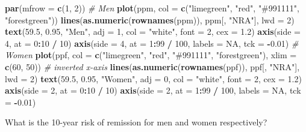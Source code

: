 \documentclass[
]{book}
\newenvironment{Shaded}{\begin{snugshade}}{\end{snugshade}}
\newcommand{\AttributeTok}[1]{\textcolor[rgb]{0.13,0.29,0.53}{#1}}
\newcommand{\CommentTok}[1]{\textcolor[rgb]{0.56,0.35,0.01}{\textit{#1}}}
\newcommand{\ConstantTok}[1]{\textcolor[rgb]{0.56,0.35,0.01}{#1}}
\newcommand{\DecValTok}[1]{\textcolor[rgb]{0.00,0.00,0.81}{#1}}
\newcommand{\FloatTok}[1]{\textcolor[rgb]{0.00,0.00,0.81}{#1}}
\newcommand{\FunctionTok}[1]{\textcolor[rgb]{0.13,0.29,0.53}{\textbf{#1}}}
\newcommand{\NormalTok}[1]{#1}
\newcommand{\SpecialCharTok}[1]{\textcolor[rgb]{0.81,0.36,0.00}{\textbf{#1}}}
\newcommand{\StringTok}[1]{\textcolor[rgb]{0.31,0.60,0.02}{#1}}
\begin{document}
\begin{enumerate}
\begin{Shaded}
\begin{Highlighting}[]
\FunctionTok{par}\NormalTok{(}\AttributeTok{mfrow =} \FunctionTok{c}\NormalTok{(}\DecValTok{1}\NormalTok{, }\DecValTok{2}\NormalTok{))}
\CommentTok{\# Men}
\FunctionTok{plot}\NormalTok{(ppm, }\AttributeTok{col =} \FunctionTok{c}\NormalTok{(}\StringTok{"limegreen"}\NormalTok{, }\StringTok{"red"}\NormalTok{, }\StringTok{"\#991111"}\NormalTok{, }\StringTok{"forestgreen"}\NormalTok{))}
\FunctionTok{lines}\NormalTok{(}\FunctionTok{as.numeric}\NormalTok{(}\FunctionTok{rownames}\NormalTok{(ppm)), ppm[, }\StringTok{"NRA"}\NormalTok{], }\AttributeTok{lwd =} \DecValTok{2}\NormalTok{)}
\FunctionTok{text}\NormalTok{(}\FloatTok{59.5}\NormalTok{, }\FloatTok{0.95}\NormalTok{, }\StringTok{"Men"}\NormalTok{, }\AttributeTok{adj =} \DecValTok{1}\NormalTok{, }\AttributeTok{col =} \StringTok{"white"}\NormalTok{, }\AttributeTok{font =} \DecValTok{2}\NormalTok{, }\AttributeTok{cex =} \FloatTok{1.2}\NormalTok{)}
\FunctionTok{axis}\NormalTok{(}\AttributeTok{side =} \DecValTok{4}\NormalTok{, }\AttributeTok{at =} \DecValTok{0}\SpecialCharTok{:}\DecValTok{10} \SpecialCharTok{/} \DecValTok{10}\NormalTok{)}
\FunctionTok{axis}\NormalTok{(}\AttributeTok{side =} \DecValTok{4}\NormalTok{, }\AttributeTok{at =} \DecValTok{1}\SpecialCharTok{:}\DecValTok{99} \SpecialCharTok{/} \DecValTok{100}\NormalTok{, }\AttributeTok{labels =} \ConstantTok{NA}\NormalTok{, }\AttributeTok{tck =} \SpecialCharTok{{-}}\FloatTok{0.01}\NormalTok{)}
\CommentTok{\# Women }
\FunctionTok{plot}\NormalTok{(ppf, }\AttributeTok{col =} \FunctionTok{c}\NormalTok{(}\StringTok{"limegreen"}\NormalTok{, }\StringTok{"red"}\NormalTok{, }\StringTok{"\#991111"}\NormalTok{, }\StringTok{"forestgreen"}\NormalTok{),}
          \AttributeTok{xlim =} \FunctionTok{c}\NormalTok{(}\DecValTok{60}\NormalTok{, }\DecValTok{50}\NormalTok{)) }\CommentTok{\# inverted x{-}axis}
\FunctionTok{lines}\NormalTok{(}\FunctionTok{as.numeric}\NormalTok{(}\FunctionTok{rownames}\NormalTok{(ppf)), ppf[, }\StringTok{"NRA"}\NormalTok{], }\AttributeTok{lwd =} \DecValTok{2}\NormalTok{)}
\FunctionTok{text}\NormalTok{(}\FloatTok{59.5}\NormalTok{, }\FloatTok{0.95}\NormalTok{, }\StringTok{"Women"}\NormalTok{, }\AttributeTok{adj =} \DecValTok{0}\NormalTok{, }\AttributeTok{col =} \StringTok{"white"}\NormalTok{, }\AttributeTok{font =} \DecValTok{2}\NormalTok{, }\AttributeTok{cex =} \FloatTok{1.2}\NormalTok{)}
\FunctionTok{axis}\NormalTok{(}\AttributeTok{side =} \DecValTok{2}\NormalTok{, }\AttributeTok{at =} \DecValTok{0}\SpecialCharTok{:}\DecValTok{10} \SpecialCharTok{/} \DecValTok{10}\NormalTok{)}
\FunctionTok{axis}\NormalTok{(}\AttributeTok{side =} \DecValTok{2}\NormalTok{, }\AttributeTok{at =} \DecValTok{1}\SpecialCharTok{:}\DecValTok{99} \SpecialCharTok{/} \DecValTok{100}\NormalTok{, }\AttributeTok{labels =} \ConstantTok{NA}\NormalTok{, }\AttributeTok{tck =} \SpecialCharTok{{-}}\FloatTok{0.01}\NormalTok{)}
\end{Highlighting}
\end{Shaded}

  What is the 10-year risk of remission for men and women respectively?
\end{enumerate}

  
\end{document}
